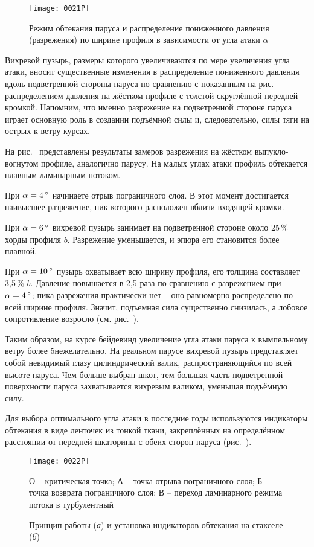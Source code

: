 \begin{figure*}[htb]
  \centering
  \texttt{[image: 0021P]}
  \caption{Режим обтекания паруса и распределение пониженного давления (разрежения) по ширине профиля в зависимости от угла атаки $\alpha$}
  \label{fig:21}
\end{figure*}

Вихревой пузырь, размеры которого увеличиваются по мере увеличения угла атаки, вносит существенные изменения в распределение пониженного давления вдоль подветренной стороны паруса по сравнению с показанным на рис.~ распределением давления на жёстком профиле с толстой скруглённой передней кромкой. Напомним, что именно разрежение на подветренной стороне паруса играет основную роль в создании подъёмной силы и, следовательно, силы тяги на острых к ветру курсах. 

На рис.~ представлены результаты замеров разрежения на жёстком выпукло-вогнутом профиле, аналогично парусу. На малых углах атаки профиль обтекается плавным ламинарным потоком. 

При $\alpha = 4\,^\circ$ начинаете отрыв пограничного слоя. В этот момент достигается наивысшее разрежение, пик которого расположен вблизи входящей кромки.
 
При $\alpha = 6\,^\circ$ вихревой пузырь занимает на подветренной стороне около 25\,\% хорды профиля $b$. Разрежение уменьшается, и эпюра его становится более плавной. 

При $\alpha = 10\,^\circ$ пузырь охватывает всю ширину профиля, его толщина составляет 3,5\,\% $b$. Давление повышается в 2,5 раза по сравнению с разрежением при $\alpha = 4\,^\circ$; пика разрежения практически нет \--- оно равномерно распределено по всей ширине профиля. Значит, подъемная сила существенно снизилась, а лобовое сопротивление возросло (см. рис.~). 

Таким образом, на курсе бейдевинд увеличение угла атаки паруса к вымпельному ветру более 5\gr нежелательно. На реальном парусе вихревой пузырь представляет собой невидимый глазу цилиндрический валик, распространяющийся по всей высоте паруса. Чем больше выбран шкот, тем большая часть подветренной поверхности паруса захватывается вихревым валиком, уменьшая подъёмную силу. 

Для выбора оптимального угла атаки в последние годы используются индикаторы обтекания в виде ленточек из тонкой ткани, закреплённых на определённом расстоянии от передней шкаторины с обеих сторон паруса (рис.~).

\begin{figure*}[htb]
  \centering
  \texttt{[image: 0022P]}
  \caption{Принцип работы (\textit{а}) и установка индикаторов обтекания на стакселе (\textit{б})}
  \label{fig:22}
  \small
  \centering{}
  О \--- критическая точка; А \--- точка отрыва пограничного слоя; Б \--- точка возврата пограничного слоя; В \--- переход ламинарного режима потока в турбулентный
\end{figure*}

